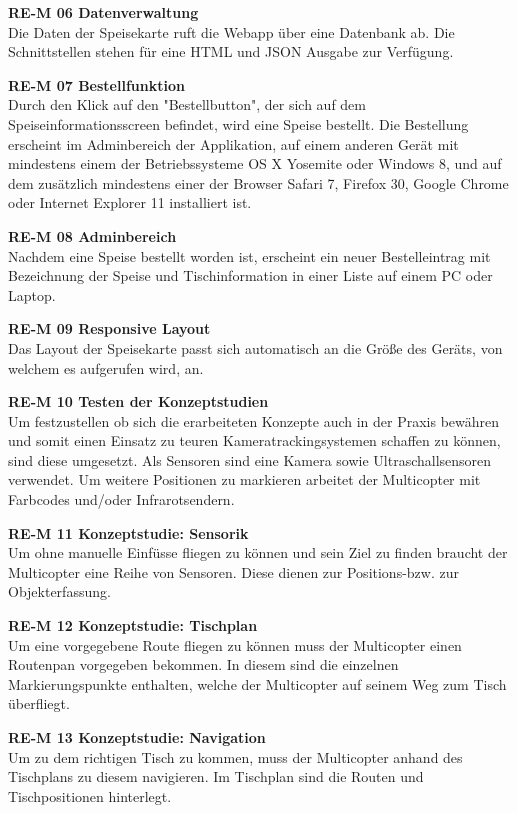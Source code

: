   \textbf{RE-M 06 Datenverwaltung}\\
  Die Daten der Speisekarte ruft die Webapp über eine Datenbank ab. Die Schnittstellen stehen für eine
  HTML und JSON Ausgabe zur Verfügung.

  \textbf{RE-M 07 Bestellfunktion}\\
  Durch den Klick auf den "Bestellbutton", der sich auf dem Speiseinformationsscreen befindet, wird eine
  Speise bestellt. Die Bestellung erscheint im Adminbereich der Applikation, auf einem anderen Gerät mit mindestens einem der Betriebssysteme
  OS X Yosemite oder Windows 8, und auf dem zusätzlich mindestens einer der Browser Safari 7, Firefox 30,
  Google Chrome oder Internet Explorer 11 installiert ist.

  \textbf{RE-M 08 Adminbereich}\\
  Nachdem eine Speise bestellt worden ist, erscheint ein neuer Bestelleintrag mit Bezeichnung der Speise
  und Tischinformation in einer Liste auf einem PC oder Laptop.

  \textbf{RE-M 09 Responsive Layout}\\
  Das Layout der Speisekarte passt sich automatisch an die Größe des Geräts, von welchem es aufgerufen wird, an.

  \textbf{RE-M 10 Testen der Konzeptstudien}\\
  Um festzustellen ob sich die erarbeiteten Konzepte auch in der Praxis bewähren und somit einen Einsatz zu
  teuren Kameratrackingsystemen schaffen zu können, sind diese umgesetzt. Als Sensoren sind eine Kamera
  sowie Ultraschallsensoren verwendet. Um weitere Positionen zu markieren arbeitet der Multicopter mit
  Farbcodes und/oder Infrarotsendern.

  \textbf{RE-M 11 Konzeptstudie: Sensorik}\\
  Um ohne manuelle Einfüsse fliegen zu können und sein Ziel zu finden braucht der Multicopter eine Reihe
  von Sensoren. Diese dienen zur Positions-bzw. zur Objekterfassung.

  \textbf{RE-M 12 Konzeptstudie: Tischplan}\\
  Um eine vorgegebene Route fliegen zu können muss der Multicopter einen Routenpan vorgegeben bekommen.
  In diesem sind die einzelnen Markierungspunkte enthalten, welche der Multicopter auf seinem Weg zum
  Tisch überfliegt.

  \textbf{RE-M 13 Konzeptstudie: Navigation}\\
  Um zu dem richtigen Tisch zu kommen, muss der Multicopter anhand des Tischplans zu diesem
  navigieren. Im Tischplan sind die Routen und Tischpositionen hinterlegt.

